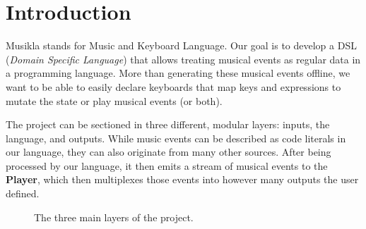\documentclass[a4paper,UKenglish,cleveref, autoref]{oasics-v2019}
\title{\ourtitle}
\author{Pedro M. Silva}{Dummy University Computing Laboratory, Portugal \and My second affiliation, Country \and \url{http://www.myhomepage.edu} }{johnqpublic@dummyuni.org}{https://orcid.org/0000-0002-1825-0097}{(Optional) author-specific funding acknowledgements}
\author{José João Almeida}%
       {Algoritmi, Departamento de Informática, Universidade do Minho, Braga, Portugal}%
       {jj@di.uminho.pt}%
       {https://orcid.org/0000-0002-0722-2031}
       {}
\begin{document}
\maketitle

\begin{abstract}
  In this paper, we'll discuss a simple approach to integrating musical events, such as notes or chords, into a programming language. First we'll analyze the problem and its particular requirements. Then we will discuss the solution we developed to meet those requirements. Finally we'll analyze the result and discuss possible alternative routes we could've taken.
\end{abstract}

\section{Introduction}
Musikla stands for Music and Keyboard Language. Our goal is to develop a DSL (\textit{Domain Specific Language}) that allows treating musical events as regular data in a programming language. More than generating these musical events offline, we want to be able to easily declare keyboards that map keys and expressions to mutate the state or play musical events (or both).

The project can be sectioned in three different, modular layers: inputs, the language, and outputs. While music events can be described as code literals in our language, they can also originate from many other sources. After being processed by our language, it then emits a stream of musical events to the \textbf{Player}, which then multiplexes those events into however many outputs the user defined.


\begin{figure}[ht]
  \centering
  {%
  \setlength{\fboxsep}{0pt}%
  \setlength{\fboxrule}{0pt}%
  }%
  \caption{The three main layers of the project.}
  \label{fig:architecture}
\end{figure}
\end{document}
